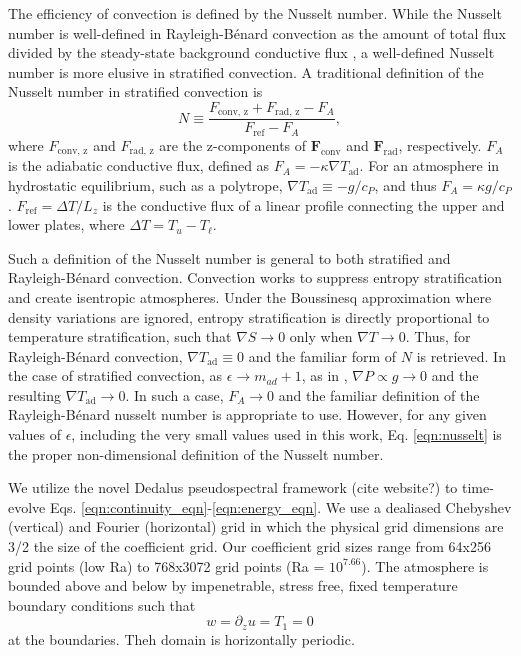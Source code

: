 \documentclass[aps, prl, twocolumn, groupedaddress]{revtex4-1}
\newcommand{\grad}{\ensuremath{\nabla}}
\newcommand{\RB}{Rayleigh-B\'{e}nard }
\begin{document}
The efficiency of convection is defined by the Nusselt number.  While the Nusselt number is well-defined in \RB convection
as the amount of total flux divided by the steady-state background conductive flux 
\cite{johnston&doering2009, otero&all2002},
a well-defined Nusselt number is more elusive in stratified convection.  A traditional definition of the Nusselt
number in stratified convection is \cite{graham1975,hurlburt&all1984}
\begin{equation}
N \equiv \frac{F_{\text{conv, z}} + F_{\text{rad, z}} - F_A}{F_{\text{ref}} - F_A},
\label{eqn:nusselt}
\end{equation}
where $F_{\text{conv, z}}$ and $F_{\text{rad, z}}$ are the z-components of $\bm{F}_{\text{conv}}$ and $\bm{F}_{\text{rad}}$,
respectively.  $F_A$ is the adiabatic conductive flux, defined as $F_A = -\kappa \grad T_{\text{ad}}$.  For an
atmosphere in hydrostatic equilibrium, such as a polytrope, $\grad T_{\text{ad}} \equiv - g / c_{P}$, and thus
$F_A = \kappa g / c_{P}$.  $F_{\text{ref}} = \Delta T / L_z$ is the conductive flux of a linear profile connecting the upper
and lower plates, where $\Delta T = T_{u} - T_{\ell}$.

Such a definition of the Nusselt number is general to both stratified and \RB convection.  Convection works to
suppress entropy stratification and create isentropic atmospheres.  Under the Boussinesq approximation where
density variations are ignored, entropy stratification is directly proportional to temperature stratification,
such that $\grad S \rightarrow 0$ only when $\grad T \rightarrow 0$.  Thus, for \RB convection, 
$\grad T_{\text{ad}} \equiv 0$ and the familiar form of $N$ is retrieved.  In the case of stratified convection,
as $\epsilon \rightarrow m_{ad} + 1$, as in \cite{brandenburg&all2005}, $\grad P \propto g \rightarrow 0$ and
the resulting $\grad T_{\text{ad}} \rightarrow 0$.  In such a case, $F_A \rightarrow 0$ and the familiar
definition of the \RB nusselt number is appropriate to use. However, for any given values of $\epsilon$, including
the very small values used in this work, Eq. \ref{eqn:nusselt} is the proper non-dimensional definition
of the Nusselt number.

We utilize the novel Dedalus pseudospectral framework (cite website?) to time-evolve Eqs. 
\ref{eqn:continuity_eqn}-\ref{eqn:energy_eqn}.  We use a dealiased Chebyshev (vertical)
and Fourier (horizontal) grid in which the
physical grid dimensions are 3/2 the size of the coefficient grid.  Our coefficient grid sizes range from
64x256 grid points (low Ra) to 768x3072 grid points (Ra = $10^{7.66}$).  The atmosphere is bounded above
and below by impenetrable, stress free, fixed temperature boundary conditions such that
\begin{equation}
w = \partial_z u = T_1 = 0
\end{equation}
at the boundaries.  Theh domain is horizontally periodic.
\end{document}
